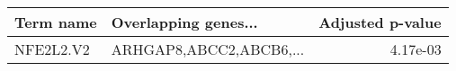 \begin{tabular}{llr}
\toprule
Term name &    Overlapping genes... &  Adjusted p-value \\
\midrule
NFE2L2.V2 & ARHGAP8,ABCC2,ABCB6,... &          4.17e-03 \\
\bottomrule
\end{tabular}
